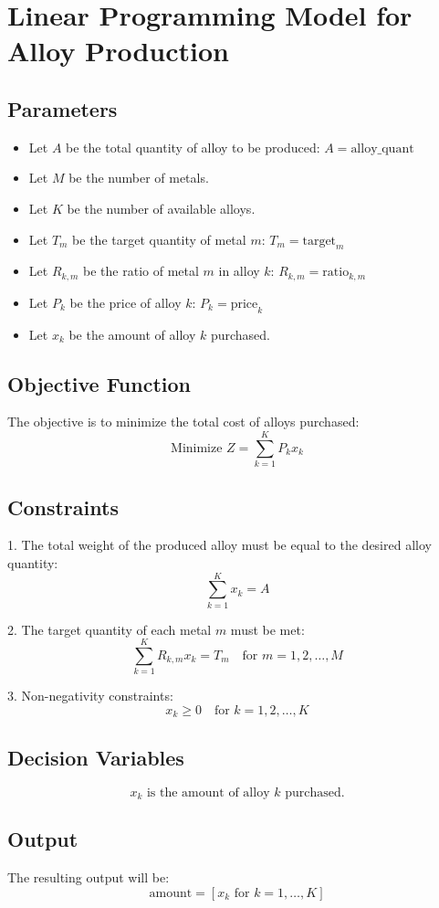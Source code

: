 \documentclass{article}
\begin{document}
\section*{Linear Programming Model for Alloy Production}

\subsection*{Parameters}
\begin{itemize}
    \item Let \( A \) be the total quantity of alloy to be produced: \( A = \text{alloy\_quant} \)
    \item Let \( M \) be the number of metals.
    \item Let \( K \) be the number of available alloys.
    \item Let \( T_m \) be the target quantity of metal \( m \): \( T_m = \text{target}_{m} \)
    \item Let \( R_{k,m} \) be the ratio of metal \( m \) in alloy \( k \): \( R_{k,m} = \text{ratio}_{k,m} \)
    \item Let \( P_k \) be the price of alloy \( k \): \( P_k = \text{price}_{k} \)
    \item Let \( x_k \) be the amount of alloy \( k \) purchased.
\end{itemize}

\subsection*{Objective Function}
The objective is to minimize the total cost of alloys purchased:
\[
\text{Minimize } Z = \sum_{k=1}^{K} P_k x_k
\]

\subsection*{Constraints}
1. The total weight of the produced alloy must be equal to the desired alloy quantity:
\[
\sum_{k=1}^{K} x_k = A
\]

2. The target quantity of each metal \( m \) must be met:
\[
\sum_{k=1}^{K} R_{k,m} x_k = T_m \quad \text{for } m = 1, 2, \ldots, M
\]

3. Non-negativity constraints:
\[
x_k \geq 0 \quad \text{for } k = 1, 2, \ldots, K
\]

\subsection*{Decision Variables}
\[
x_k \text{ is the amount of alloy } k \text{ purchased.}
\]

\subsection*{Output}
The resulting output will be:
\[
\text{amount} = [x_k \text{ for } k = 1, \ldots, K]
\]
\end{document}
